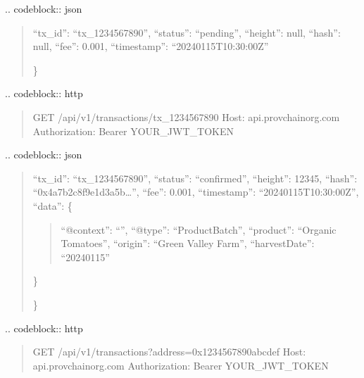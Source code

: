 \documentclass[letterpaper,10pt,english]{sphinxmanual}
\begin{document}
\sphinxAtStartPar
{}
.. code\sphinxhyphen{}block:: json
\begin{quote}
\begin{description}
\sphinxlineitem{\{}
\sphinxAtStartPar
“tx\_id”: “tx\_1234567890”,
“status”: “pending”,
“height”: null,
“hash”: null,
“fee”: 0.001,
“timestamp”: “2024\sphinxhyphen{}01\sphinxhyphen{}15T10:30:00Z”

\end{description}

\sphinxAtStartPar
\}
\end{quote}

\sphinxAtStartPar
{}
.. code\sphinxhyphen{}block:: http
\begin{quote}

\sphinxAtStartPar
GET /api/v1/transactions/tx\_1234567890
Host: api.provchain\sphinxhyphen{}org.com
Authorization: Bearer YOUR\_JWT\_TOKEN
\end{quote}

\sphinxAtStartPar
{}
.. code\sphinxhyphen{}block:: json
\begin{quote}
\begin{description}
\sphinxlineitem{\{}
\sphinxAtStartPar
“tx\_id”: “tx\_1234567890”,
“status”: “confirmed”,
“height”: 12345,
“hash”: “0x4a7b2c8f9e1d3a5b…”,
“fee”: 0.001,
“timestamp”: “2024\sphinxhyphen{}01\sphinxhyphen{}15T10:30:00Z”,
“data”: \{
\begin{quote}

\sphinxAtStartPar
“@context”: “”,
“@type”: “ProductBatch”,
“product”: “Organic Tomatoes”,
“origin”: “Green Valley Farm”,
“harvestDate”: “2024\sphinxhyphen{}01\sphinxhyphen{}15”
\end{quote}

\sphinxAtStartPar
\}

\end{description}

\sphinxAtStartPar
\}
\end{quote}

\sphinxAtStartPar
{}
.. code\sphinxhyphen{}block:: http
\begin{quote}

\sphinxAtStartPar
GET /api/v1/transactions?address=0x1234567890abcdef
Host: api.provchain\sphinxhyphen{}org.com
Authorization: Bearer YOUR\_JWT\_TOKEN
\end{quote}
\end{document}
